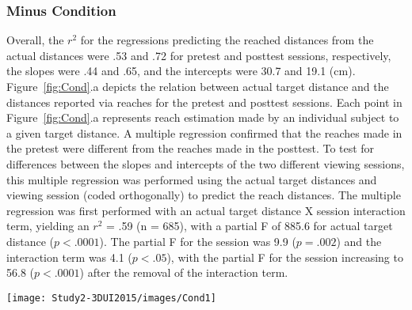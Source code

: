 \subsubsection{Minus Condition}
Overall, the $r^2$ for the regressions predicting the reached distances from the actual distances were .53 and .72 for pretest and posttest sessions, respectively, the slopes were .44 and .65, and the intercepts were 30.7 and 19.1 (cm). Figure~\ref{fig:Cond}.a depicts the relation between actual target distance and the distances reported via reaches for the pretest and posttest sessions. Each point in Figure~\ref{fig:Cond}.a represents reach estimation made by an individual subject to a given target distance. A multiple regression confirmed that the reaches made in the pretest were different from the reaches made in the posttest. To test for differences between the slopes and intercepts of the two different viewing sessions, this multiple regression was performed using the actual target distances and viewing session (coded orthogonally) to predict the reach distances. The multiple regression was first performed with an actual target distance X session interaction term, yielding an $r^2$ = .59 (n = 685), with a partial F of 885.6 for actual target distance ($p < .0001$). The partial F for the session was 9.9 ($p = .002$) and the interaction term was 4.1 ($p < .05$), with the partial F for the session increasing to 56.8 ($p < .0001$) after the removal of the interaction term.

\begin{figure*}[ht]
	\centering
	\texttt{[image: Study2-3DUI2015/images/Cond1]}
	\vspace{-1em}
	\caption{Reaches as a function of actual target distances in the pretest and posttest sessions for (a) Minus condition, (b) Neural condition, and (c) Plus condition.}
	\label{fig:Cond}
\end{figure*}

